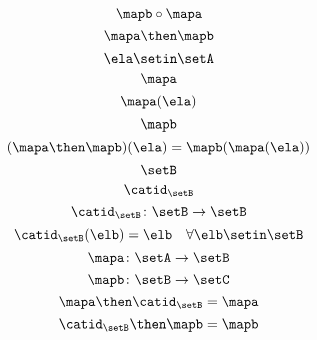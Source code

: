 \begin{forslides}
\begin{equation}
        \mapb \circ \mapa
    \end{equation}
    \begin{equation}\label{eq:slides_session2_135}
        \mapa \then \mapb
    \end{equation}
    \begin{equation}\label{eq:slides_session2_136}
        \ela \setin\setA
    \end{equation}
    \begin{equation}\label{eq:slides_session2_137}
        \mapa
    \end{equation}
    \begin{equation}\label{eq:slides_session2_138}
        \mapa(\ela)
    \end{equation}
    \begin{equation}\label{eq:slides_session2_139}
        \mapb
    \end{equation}
    \begin{equation}\label{eq:slides_session2_140}
        (\mapa \then \mapb)(\ela) = \mapb(\mapa(\ela))
    \end{equation}
    \begin{equation}\label{eq:slides_session2_141}
        \setB
    \end{equation}
    \begin{equation}\label{eq:slides_session2_142}
        \catid_\setB
    \end{equation}
    \begin{equation}\label{eq:slides_session2_142a}
        \catid_\setB \colon \setB \to \setB
    \end{equation}
    \begin{equation}\label{eq:slides_session2_143}
        \catid_\setB(\elb) = \elb \quad \forall  \elb \setin\setB
    \end{equation}
    \begin{equation}\label{eq:slides_session2_144}
        \mapa \colon \setA \to \setB
    \end{equation}
    \begin{equation}\label{eq:slides_session2_145}
        \mapb \colon \setB \to \setC
    \end{equation}
    \begin{equation}\label{eq:slides_session2_146}
        \mapa \then \catid_\setB = \mapa
    \end{equation}
    \begin{equation}\label{eq:slides_session2_147}
        \catid_\setB \then \mapb = \mapb
    \end{equation}


\end{forslides}
